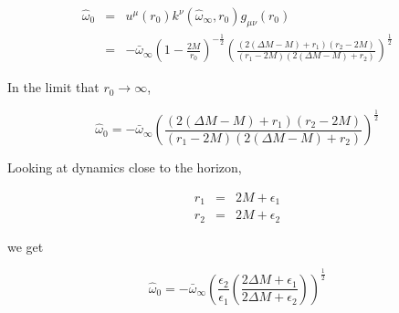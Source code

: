 \documentclass[aps,showpacs,twocolumn,floats,prd,superscriptaddress,nofootinbib]{revtex4-1}
\begin{document}
\begin{eqnarray}
	\hat{\omega}_0 & = & u^\mu(r_0) k^\nu(\hat{\omega}_\infty, r_0) g_{\mu \nu}(r_0) 	\nonumber	\\
	& = & - \bar{\omega}_\infty \left( 1 - \frac{2M}{r_0} \right)^{-\frac{1}{2}}  \left( \frac{(2 (\Delta M - M) + r_1)(r_2 - 2M)}{(r_1 - 2M)(2(\Delta M - M) + r_2)} \right)^\frac{1}{2}
\end{eqnarray}

In the limit that $r_0 \rightarrow \infty$, 

\begin{equation}
	\hat{\omega}_0 = - \bar{\omega}_\infty \left( \frac{(2 (\Delta M - M) + r_1)(r_2 - 2M)}{(r_1 - 2M)(2(\Delta M - M) + r_2)} \right)^\frac{1}{2}
\end{equation}

Looking at dynamics close to the horizon, 

\begin{eqnarray}
	r_1 & = & 2M + \epsilon_1	\nonumber	\\
	r_2 & = & 2M + \epsilon_2
\end{eqnarray}

we get

\begin{equation}
	\hat{\omega}_0 = - \bar{\omega}_\infty \left( \frac{\epsilon_2}{\epsilon_1} \left( \frac{2 \Delta M + \epsilon_1}{2 \Delta M + \epsilon_2} \right) \right)^\frac{1}{2}
\end{equation}

















\end{document}
